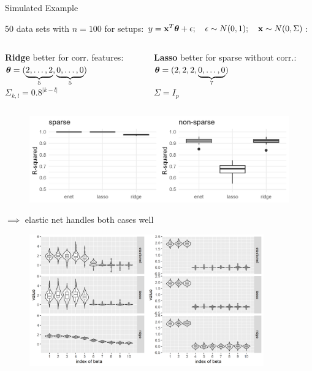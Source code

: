 \documentclass[11pt,compress,t,notes=noshow, xcolor=table]{beamer}
\begin{document}
\begin{vbframe} {Simulated Example}

\footnotesize
50 data sets with $n=100$ for setups: $y =\mathbf{x}^T \bm{\theta} + \epsilon; \quad \epsilon \sim N(0,1);
  \quad \mathbf{x} \sim N(0, \Sigma)$: 
\vspace{-0.3cm}
\begin{columns}
\begin{column}{0.5\textwidth}
\begin{center}
{\footnotesize \textbf{Ridge} better for corr. features}: \\ 
$\bm{\theta}=(\underbrace{2,\ldots,2}_{5},\underbrace{0,\ldots,0}_{5})$\\
$ \Sigma_{k,l}=0.8^{|k-l|}$ 
  \end{center}
\end{column}
\begin{column}{0.5\textwidth} 
\begin{center}
{\footnotesize \textbf{Lasso} better for sparse without corr.:} \\
$\bm{\theta}=(2, 2, 2,\underbrace{0,\ldots,0}_{7})$ \\
$ \Sigma = I_p$ 
\end{center}
\end{column}
\end{columns}

\begin{figure}
\includegraphics[width=\textwidth]{figure/enet_lasso_ridge_r2.png}\\
\end{figure}
{\normalsize $\implies$ elastic net handles both cases well}
\framebreak

\begin{figure}
\includegraphics[width=0.9\textwidth]{figure/enet_tradeoff.png}\\
\end{figure}



\end{vbframe}
\end{document}
